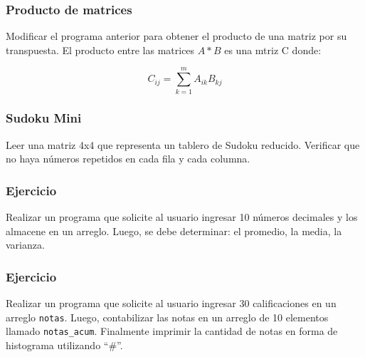 \subsubsection{Producto de matrices}
Modificar el programa anterior para obtener el producto de una matriz por su transpuesta. El producto entre las matrices $A*B$ es una mtriz C donde:

$$C_{ij}=\sum_{k=1}^{m}{A_{ik}B_{kj}} $$

\subsubsection{Sudoku Mini}
Leer una matriz 4x4 que representa un tablero de Sudoku reducido. Verificar que no haya números repetidos en cada fila y cada columna.

\subsubsection{Ejercicio}
Realizar un programa que solicite al usuario ingresar 10 números decimales y los almacene en un arreglo. Luego, se debe determinar: el promedio, la media, la varianza.

\subsubsection{Ejercicio}
Realizar un programa que solicite al usuario ingresar 30 calificaciones en un arreglo \texttt{notas}. Luego, contabilizar las notas en un arreglo de 10 elementos llamado \texttt{notas\_acum}. Finalmente imprimir la cantidad de notas en forma de histograma utilizando ``\#''.
